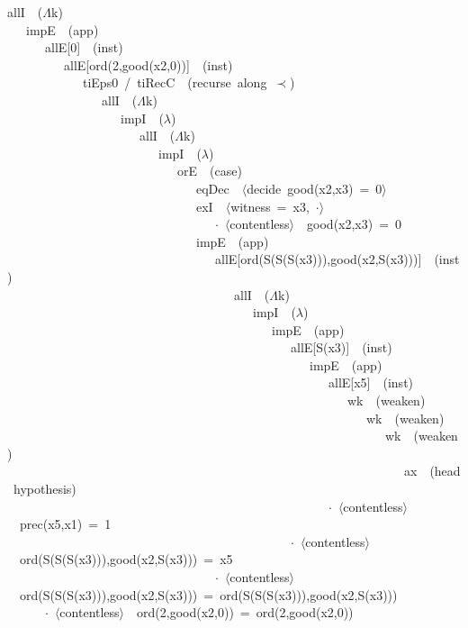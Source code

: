 allI~~($\Lambda$k) \\
~~~impE~~(app) \\
~~~~~~allE[0]~~(inst) \\
~~~~~~~~~allE[ord(2,good(x2,0))]~~(inst) \\
~~~~~~~~~~~~tiEps0~/~tiRecC~~(recurse~along~$\prec$) \\
~~~~~~~~~~~~~~~allI~~($\Lambda$k) \\
~~~~~~~~~~~~~~~~~~impI~~($\lambda$) \\
~~~~~~~~~~~~~~~~~~~~~allI~~($\Lambda$k) \\
~~~~~~~~~~~~~~~~~~~~~~~~impI~~($\lambda$) \\
~~~~~~~~~~~~~~~~~~~~~~~~~~~orE~~(case) \\
~~~~~~~~~~~~~~~~~~~~~~~~~~~~~~eqDec~~$\langle$decide~good(x2,x3)~=~0$\rangle$ \\
~~~~~~~~~~~~~~~~~~~~~~~~~~~~~~exI~~$\langle$witness~=~x3,~$\cdot$$\rangle$ \\
~~~~~~~~~~~~~~~~~~~~~~~~~~~~~~~~~$\cdot$~$\langle$contentless$\rangle$~~good(x2,x3)~=~0 \\
~~~~~~~~~~~~~~~~~~~~~~~~~~~~~~impE~~(app) \\
~~~~~~~~~~~~~~~~~~~~~~~~~~~~~~~~~allE[ord(S(S(S(x3))),good(x2,S(x3)))]~~(inst) \\
~~~~~~~~~~~~~~~~~~~~~~~~~~~~~~~~~~~~allI~~($\Lambda$k) \\
~~~~~~~~~~~~~~~~~~~~~~~~~~~~~~~~~~~~~~~impI~~($\lambda$) \\
~~~~~~~~~~~~~~~~~~~~~~~~~~~~~~~~~~~~~~~~~~impE~~(app) \\
~~~~~~~~~~~~~~~~~~~~~~~~~~~~~~~~~~~~~~~~~~~~~allE[S(x3)]~~(inst) \\
~~~~~~~~~~~~~~~~~~~~~~~~~~~~~~~~~~~~~~~~~~~~~~~~impE~~(app) \\
~~~~~~~~~~~~~~~~~~~~~~~~~~~~~~~~~~~~~~~~~~~~~~~~~~~allE[x5]~~(inst) \\
~~~~~~~~~~~~~~~~~~~~~~~~~~~~~~~~~~~~~~~~~~~~~~~~~~~~~~wk~~(weaken) \\
~~~~~~~~~~~~~~~~~~~~~~~~~~~~~~~~~~~~~~~~~~~~~~~~~~~~~~~~~wk~~(weaken) \\
~~~~~~~~~~~~~~~~~~~~~~~~~~~~~~~~~~~~~~~~~~~~~~~~~~~~~~~~~~~~wk~~(weaken) \\
~~~~~~~~~~~~~~~~~~~~~~~~~~~~~~~~~~~~~~~~~~~~~~~~~~~~~~~~~~~~~~~ax~~(head~hypothesis) \\
~~~~~~~~~~~~~~~~~~~~~~~~~~~~~~~~~~~~~~~~~~~~~~~~~~~$\cdot$~$\langle$contentless$\rangle$~~prec(x5,x1)~=~1 \\
~~~~~~~~~~~~~~~~~~~~~~~~~~~~~~~~~~~~~~~~~~~~~$\cdot$~$\langle$contentless$\rangle$~~ord(S(S(S(x3))),good(x2,S(x3)))~=~x5 \\
~~~~~~~~~~~~~~~~~~~~~~~~~~~~~~~~~$\cdot$~$\langle$contentless$\rangle$~~ord(S(S(S(x3))),good(x2,S(x3)))~=~ord(S(S(S(x3))),good(x2,S(x3))) \\
~~~~~~$\cdot$~$\langle$contentless$\rangle$~~ord(2,good(x2,0))~=~ord(2,good(x2,0))
